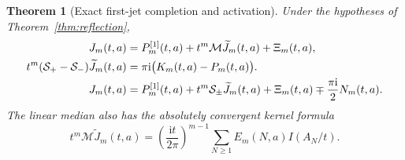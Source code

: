 \documentclass[11pt,a4paper]{article}
\numberwithin{equation}{section}
\newtheorem{theorem}{Theorem}[section]
\theoremstyle{definition}\newtheorem{definition}[theorem]{Definition}
\theoremstyle{remark}\newtheorem{remark}[theorem]{Remark}
\newcommand{\ii}{\mathrm i}\newcommand{\e}{\mathrm e}
\newcommand{\Sm}{\mathcal S_-}\newcommand{\Med}{\mathcal M}
\begin{document}
\begin{theorem}[Exact first-jet completion and activation]
\label{thm:activation}
Under the hypotheses of Theorem~\ref{thm:reflection},
\begin{align}
 J_m(t,a)&=P_m^{[1]}(t,a)+t^m\Med\widetilde J_m(t,a)+\Xi_m(t,a),
                    \label{eq:exact-J-median}\\
 t^m(\Sp-\Sm)\widetilde J_m(t,a)
              &=\pi\ii\bigl(K_m(t,a)-P_m(t,a)\bigr).
                    \label{eq:activation}\\
 J_m(t,a)&=P_m^{[1]}(t,a)+t^m\mathcal S_\pm\widetilde J_m(t,a)
             +\Xi_m(t,a)\mp\frac{\pi\ii}{2}N_m(t,a).
                    \label{eq:exact-J-lateral}
\end{align}
The linear median also has the absolutely convergent kernel formula
\begin{equation}
 t^m\Med\widetilde J_m(t,a)
       =\left(\frac{\ii t}{2\pi}\right)^{m-1}
                         \sum_{N\ge1}E_m(N,a)I(A_N/t).
 \label{eq:median-I}
\end{equation}
\end{theorem}
\end{document}
